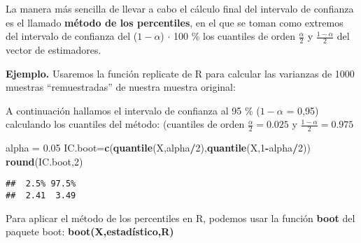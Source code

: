 \documentclass[
]{article}
\newenvironment{Shaded}{\begin{snugshade}}{\end{snugshade}}
\newcommand{\DataTypeTok}[1]{\textcolor[rgb]{0.13,0.29,0.53}{#1}}
\newcommand{\DecValTok}[1]{\textcolor[rgb]{0.00,0.00,0.81}{#1}}
\newcommand{\FloatTok}[1]{\textcolor[rgb]{0.00,0.00,0.81}{#1}}
\newcommand{\KeywordTok}[1]{\textcolor[rgb]{0.13,0.29,0.53}{\textbf{#1}}}
\newcommand{\NormalTok}[1]{#1}
\newcommand{\OperatorTok}[1]{\textcolor[rgb]{0.81,0.36,0.00}{\textbf{#1}}}
\newcommand{\OtherTok}[1]{\textcolor[rgb]{0.56,0.35,0.01}{#1}}
\newcommand{\StringTok}[1]{\textcolor[rgb]{0.31,0.60,0.02}{#1}}
\begin{document}
La manera más sencilla de llevar a cabo el cálculo final del intervalo
de confianza es el llamado \textbf{método de los percentiles}, en el que
se toman como extremos del intervalo de confianza del (\(1-\alpha\))
\(\cdot\) 100 \% los cuantiles de orden \(\frac{\alpha}{2}\) y
\(\frac{1-\alpha}{2}\) del vector de estimadores.

\textbf{Ejemplo.} Usaremos la función replicate de R para calcular las
varianzas de 1000 muestras ``remuestradas'' de nuestra muestra original:

\begin{Shaded}
\end{Shaded}

A continuación hallamos el intervalo de confianza al 95 \% (\(1-\alpha\)
= 0,95) calculando los cuantiles del método: (cuantiles de orden
\(\frac{\alpha}{2}= 0.025\) y \(\frac{1-\alpha}{2} = 0.975\)

\begin{Shaded}
\begin{Highlighting}[]
\NormalTok{alpha =}\StringTok{ }\FloatTok{0.05}
\NormalTok{IC.boot=}\KeywordTok{c}\NormalTok{(}\KeywordTok{quantile}\NormalTok{(X,alpha}\OperatorTok{/}\DecValTok{2}\NormalTok{),}\KeywordTok{quantile}\NormalTok{(X,}\DecValTok{1}\OperatorTok{-}\NormalTok{alpha}\OperatorTok{/}\DecValTok{2}\NormalTok{))}
\KeywordTok{round}\NormalTok{(IC.boot,}\DecValTok{2}\NormalTok{)}
\end{Highlighting}
\end{Shaded}

\begin{verbatim}
##  2.5% 97.5% 
##  2.41  3.49
\end{verbatim}

Para aplicar el método de los percentiles en R, podemos usar la función
\textbf{boot} del paquete boot: \textbf{boot(X,estadístico,R)}
\end{document}
